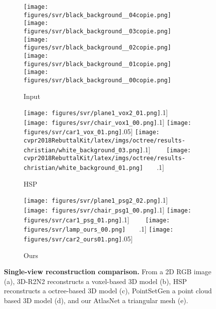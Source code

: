 \documentclass[10pt,twocolumn,letterpaper]{article}
\newcommand{\ournet}{AtlasNet}
\begin{document}
\begin{figure}[t!]

\centering
\begin{subfigure}[b]{0.19\linewidth}
\centering
 \texttt{[image: figures/svr/black\_background\_\_04copie.png]}\\
 \texttt{[image: figures/svr/black\_background\_\_03copie.png]}\\
 \texttt{[image: figures/svr/black\_background\_\_02copie.png]}\\
 \texttt{[image: figures/svr/black\_background\_\_01copie.png]}\\
 \texttt{[image: figures/svr/black\_background\_\_00copie.png]}
\caption{Input}
\end{subfigure}
\begin{subfigure}[b]{0.19\linewidth}
\centering
 \texttt{[image: figures/svr/plane1\_vox2\_01.png]}\0.1\linewidth]
 \texttt{[image: figures/svr/chair\_vox1\_00.png]}\0.1\linewidth]
 \texttt{[image: figures/svr/car1\_vox\_01.png]}\0.05\linewidth]
 \texttt{[image: cvpr2018RebuttalKit/latex/imgs/octree/results-christian/white\_background\_03.png]}\0.1\linewidth]
 ~~~~\texttt{[image: cvpr2018RebuttalKit/latex/imgs/octree/results-christian/white\_background\_01.png]}~~~~\0.1\linewidth]
\caption{HSP}
\end{subfigure}
\begin{subfigure}[b]{0.19\linewidth}
\centering
 \texttt{[image: figures/svr/plane1\_psg2\_02.png]}\0.1\linewidth]
 \texttt{[image: figures/svr/chair\_psg1\_00.png]}\0.1\linewidth]
 \texttt{[image: figures/svr/car1\_psg\_01.png]}\0.1\linewidth]
 ~~~~\texttt{[image: figures/svr/lamp\_ours\_00.png]}~~~~\0.1\linewidth]
 \texttt{[image: figures/svr/car2\_ours01.png]}\0.05\linewidth]
\caption{Ours}
\end{subfigure}
\caption{
{\bf Single-view reconstruction comparison.}
From a 2D RGB image (a), 3D-R2N2 \cite{choy20163d} reconstructs a voxel-based 3D model (b),  HSP \cite{Hane:2017} reconstructs a octree-based 3D model (c), PointSetGen \cite{Fan:2017:cvpr} a point cloud based 3D model (d), and our \ournet{} a triangular mesh (e).}
 \label{fig:svr_comparison}
 \vspace{-4mm}
\end{figure}
\end{document}
